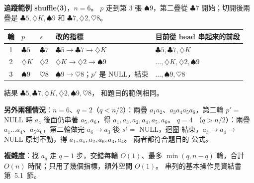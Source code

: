 \begin{pastsoln}
\textbf{追蹤範例 shuffle(3)}，$n = 6$。 $p$ 走到第 $3$ 張 $\spadesuit 9$，第二疊從
$\clubsuit 7$ 開始；切開後兩疊是 $\clubsuit 5, \diamondsuit K, \spadesuit 9$ 和
$\clubsuit 7, \diamondsuit 2, \heartsuit 8$。
\begin{center}
\begin{tabular}{cllll}
\toprule
輪 & $p$ & $s$ & 改的指標 & 目前從 head 串起來的前段 \\
\midrule
1 & $\clubsuit 5$ & $\clubsuit 7$ & $\clubsuit 5 \to \clubsuit 7 \to \diamondsuit K$ & $\clubsuit 5, \clubsuit 7, \diamondsuit K$ \\
2 & $\diamondsuit K$ & $\diamondsuit 2$ & $\diamondsuit K \to \diamondsuit 2 \to \spadesuit 9$ & $\ldots, \diamondsuit K, \diamondsuit 2, \spadesuit 9$ \\
3 & $\spadesuit 9$ & $\heartsuit 8$ & $\spadesuit 9 \to \heartsuit 8$；$p'$ 是 NULL，結束 & $\ldots, \spadesuit 9, \heartsuit 8$ \\
\bottomrule
\end{tabular}
\end{center}
結果 $\clubsuit 5, \clubsuit 7, \diamondsuit K, \diamondsuit 2, \spadesuit 9, \heartsuit 8$，
和題目的範例相同。

\textbf{另外兩種情況}：$n = 6$、$q = 2$（$q < n/2$）：兩疊 $a_1 a_2$、$a_3 a_4 a_5 a_6$，第二輪
$p' = $ NULL 時 $a_4$ 後面仍串著 $a_5, a_6$，得 $a_1, a_3, a_2, a_4, a_5, a_6$。 $q = 4$
（$q > n/2$）：兩疊 $a_1 \ldots a_4$、$a_5 a_6$，第二輪做完 $a_6 \to a_3$ 後 $s' = $ NULL，迴圈
結束，$a_3 \to a_4 \to$ NULL 原封不動，得 $a_1, a_5, a_2, a_6, a_3, a_4$。 兩者都符合題目的
公式。

\textbf{複雜度}：找 $a_q$ 走 $q - 1$ 步，交錯每輪 $O(1)$、最多 $\min(q, n - q)$ 輪，合計
$O(n)$ 時間；只用了幾個指標，額外空間 $O(1)$。 串列的基本操作見資結書第~5.1~節。
\end{pastsoln}
